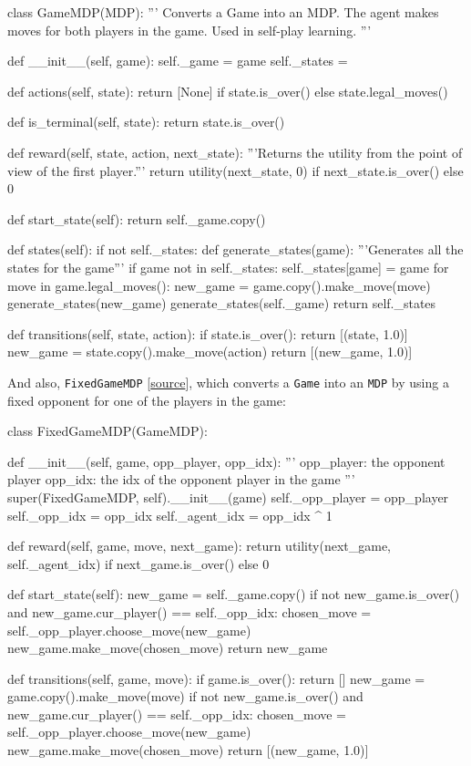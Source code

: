\documentclass{article}
\newcommand{\GithubURL}[1]{[\href{https://github.com/davidrobles/mlnd-capstone-code/blob/master/#1}{source}]}
\begin{document}
\begin{python}
class GameMDP(MDP):
    '''
    Converts a Game into an MDP. The agent makes moves for both players
    in the game. Used in self-play learning.
    '''

    def __init__(self, game):
        self._game = game
        self._states = {}

    def actions(self, state):
        return [None] if state.is_over() else state.legal_moves()

    def is_terminal(self, state):
        return state.is_over()

    def reward(self, state, action, next_state):
        '''Returns the utility from the point of view of the first player.'''
        return utility(next_state, 0) if next_state.is_over() else 0

    def start_state(self):
        return self._game.copy()

    def states(self):
        if not self._states:
            def generate_states(game):
                '''Generates all the states for the game'''
                if game not in self._states:
                    self._states[game] = game
                for move in game.legal_moves():
                    new_game = game.copy().make_move(move)
                    generate_states(new_game)
            generate_states(self._game)
        return self._states

    def transitions(self, state, action):
        if state.is_over():
            return [(state, 1.0)]
        new_game = state.copy().make_move(action)
        return [(new_game, 1.0)]
\end{python}

And also, \texttt{FixedGameMDP} \GithubURL{capstone/rl/mdp.py}, which converts a \texttt{Game} into
an \texttt{MDP} by using a fixed opponent for one of the players in the game:

\begin{python}
class FixedGameMDP(GameMDP):

    def __init__(self, game, opp_player, opp_idx):
        '''
        opp_player: the opponent player
        opp_idx: the idx of the opponent player in the game
        '''
        super(FixedGameMDP, self).__init__(game)
        self._opp_player = opp_player
        self._opp_idx = opp_idx
        self._agent_idx = opp_idx ^ 1

    def reward(self, game, move, next_game):
        return utility(next_game, self._agent_idx) if next_game.is_over() else 0

    def start_state(self):
        new_game = self._game.copy()
        if not new_game.is_over() and new_game.cur_player() == self._opp_idx:
            chosen_move = self._opp_player.choose_move(new_game)
            new_game.make_move(chosen_move)
        return new_game

    def transitions(self, game, move):
        if game.is_over():
            return []
        new_game = game.copy().make_move(move)
        if not new_game.is_over() and new_game.cur_player() == self._opp_idx:
            chosen_move = self._opp_player.choose_move(new_game)
            new_game.make_move(chosen_move)
        return [(new_game, 1.0)]
\end{python}
\end{document}
